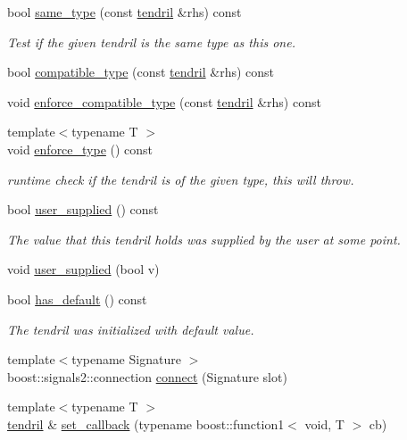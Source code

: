 \begin{DoxyCompactItemize}
bool \hyperlink{classecto_1_1tendril_a7974ef8e1d4cd1936a72c429c0f3dbf7}{same\-\_\-type} (const \hyperlink{classecto_1_1tendril}{tendril} \&rhs) const 
\begin{DoxyCompactList}\small\item\em Test if the given tendril is the same type as this one. \end{DoxyCompactList}\item 
bool \hyperlink{classecto_1_1tendril_a7033cbab493d0120443b69c951e5d26c}{compatible\-\_\-type} (const \hyperlink{classecto_1_1tendril}{tendril} \&rhs) const 
\item 
void \hyperlink{classecto_1_1tendril_ae856d0e8b9b6eb899e9b6a9b6472e231}{enforce\-\_\-compatible\-\_\-type} (const \hyperlink{classecto_1_1tendril}{tendril} \&rhs) const 
\item 
{\footnotesize template$<$typename T $>$ }\\void \hyperlink{classecto_1_1tendril_a9322a1212d70252a9a7c4f5192871475}{enforce\-\_\-type} () const 
\begin{DoxyCompactList}\small\item\em runtime check if the tendril is of the given type, this will throw. \end{DoxyCompactList}\item 
bool \hyperlink{classecto_1_1tendril_a8c46edfd052cdae0fef4705d5f5943c6}{user\-\_\-supplied} () const 
\begin{DoxyCompactList}\small\item\em The value that this tendril holds was supplied by the user at some point. \end{DoxyCompactList}\item 
void \hyperlink{classecto_1_1tendril_a3aa500420a52a0546e21105b3fb96ad0}{user\-\_\-supplied} (bool v)
\item 
bool \hyperlink{classecto_1_1tendril_af8a2ace0ae30083415116db06644ba17}{has\-\_\-default} () const 
\begin{DoxyCompactList}\small\item\em The tendril was initialized with default value. \end{DoxyCompactList}\item 
{\footnotesize template$<$typename Signature $>$ }\\boost\-::signals2\-::connection \hyperlink{classecto_1_1tendril_a94a24ca32acd13f83f5af41030a77fdf}{connect} (Signature slot)
\item 
{\footnotesize template$<$typename T $>$ }\\\hyperlink{classecto_1_1tendril}{tendril} \& \hyperlink{classecto_1_1tendril_ab3c536756c1b4eb24c97691d23eb485a}{set\-\_\-callback} (typename boost\-::function1$<$ void, T $>$ cb)

\end{DoxyCompactItemize}
